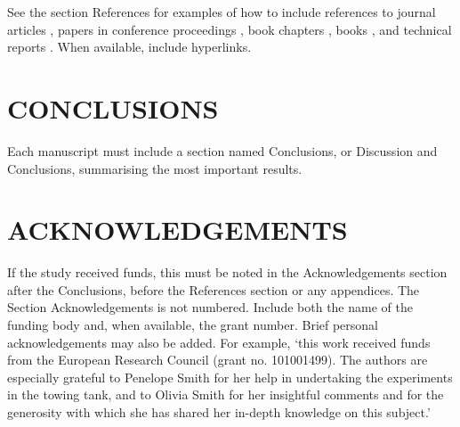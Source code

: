 \documentclass[oneside, a4paper, onecolumn, 11pt]{article}
\begin{document}
See the section References for examples of how to include references to journal articles \citep[e.g.][]{Viola2013AMR,Viola2021OE,Viola2010IJSCTForces,Viola2013IJHFF,Viola2013IJNMF}, papers in conference proceedings \citep[e.g.][]{Viola2011CSYS}, book chapters \citep[e.g.]{Viola2013SNAMETrans}, books \citep[e.g.][]{Lanchester1907}, and technical reports \citep[e.g.][]{Carter1984}. When available, include hyperlinks. 


\section{CONCLUSIONS} \label{sec:conclusions}

Each manuscript must include a section named Conclusions, or Discussion and Conclusions, summarising the most important results. 


\section*{ACKNOWLEDGEMENTS}

If the study received funds, this must be noted in the Acknowledgements section after the Conclusions, before the References section or any appendices. The Section Acknowledgements is not numbered. Include both the name of the funding body and, when available, the grant number. Brief personal acknowledgements may also be added. For example, `this work received funds from the European Research Council (grant no. 101001499). The authors are especially grateful to Penelope Smith for her help in undertaking the experiments in the towing tank, and to Olivia Smith for her insightful comments and for the generosity with which she has shared her in-depth knowledge on this subject.'


\end{document}
